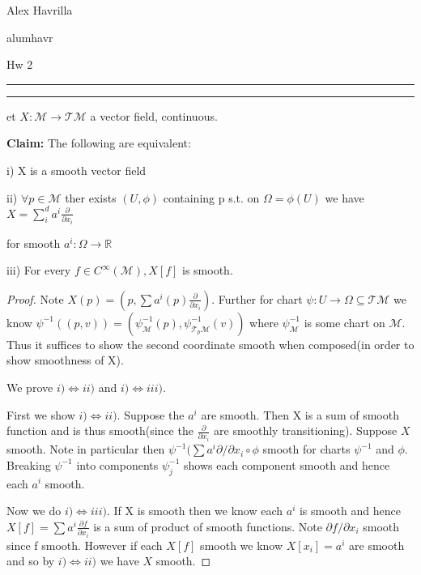 \documentclass[11pt]{article}
\newcommand{\R}{\mathbb{R}}
\newcommand{\m}{\mathcal{M}}
\newcommand{\tT}{\mathcal{T}}
\newcommand{\question}[2] {\vspace{.25in} \hrule\vspace{0.5em}
\noindent{\bf #1: #2} \vspace{0.5em}
\hrule \vspace{.10in}}
\newcommand{\myname}{Alex Havrilla}
\newcommand{\myandrew}{alumhavr}
\newcommand{\myhwnum}{Hw 2}
\begin{document}
\medskip                        

\thispagestyle{plain}
\begin{center}

{\myname}

\myandrew

\myhwnum

\end{center}



\question{Question 1}


Set $X : \m \to \tT \m$ a vector field, continuous. 

\textbf{Claim:} The following are equivalent:

i) X is a smooth vector field

ii) $\forall p \in \m$ ther exists $(U,\phi)$ containing p s.t. on $\Omega = \phi(U)$ we have $X = \sum_i^d a^i \frac{\partial}{\partial x_i}$

for smooth $a^i : \Omega \to \R$

iii) For every $f \in C^{\infty}(\m), X[f]$ is smooth.

\begin{proof}

Note $X(p) = (p,\sum a^i(p)\frac{\partial}{\partial x_i})$. Further for chart $\psi: U \to \Omega \subseteq \tT \m$ we know $\psi^{-1}((p,v)) = (\psi^{-1}_{\m}(p),\psi^{-1}_{\tT_p \m}(v))$ where $\psi^{-1}_{\m}$ is some chart on $\m$. Thus it suffices to show the second coordinate smooth when composed(in order to show smoothness of X).

We prove $i) \iff ii)$ and $i) \iff iii)$. 

First we show $i) \iff ii)$. Suppose the $a^i$ are smooth. Then X is a sum of smooth function and is thus smooth(since the $\frac{\partial}{\partial x_i}$ are smoothly transitioning). Suppose $X$ smooth. Note in particular then $\psi^{-1}(\sum a^i\partial/\partial x_i\circ \phi$ smooth for charts $\psi^{-1}$ and $\phi$. Breaking $\psi^{-1}$ into components $\psi^{-1}_j$ shows each component smooth and hence each $a^i$ smooth. 

Now we do $i) \iff iii)$. If X is smooth then we know each $a^i$ is smooth and hence $X[f] = \sum a^i \frac{\partial f}{\partial x_i}$ is a sum of product of smooth functions. Note $\partial f/\partial x_i$ smooth since f smooth. However if each $X[f]$ smooth we know $X[x_i] = a^i$ are smooth and so by $i) \iff ii)$ we have $X$ smooth. 

\end{proof}
\end{document}
